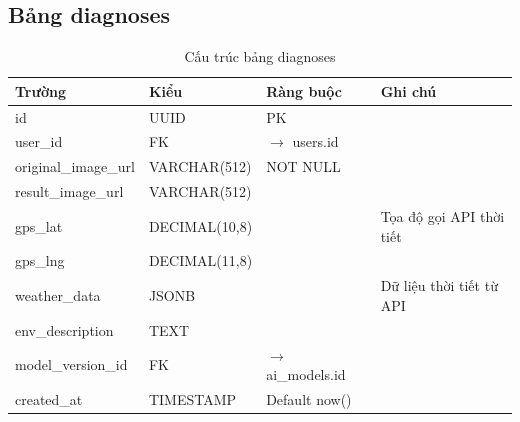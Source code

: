 \documentclass[12pt,a4paper]{article}
\begin{document}
\subsection{Bảng diagnoses}
\begin{longtable}{|l|l|l|p{5.5cm}|}
    \caption{Cấu trúc bảng diagnoses}                                                             \\
    \hline
    \rowcolor{headerblue}
    \textbf{Trường}      & \textbf{Kiểu} & \textbf{Ràng buộc}          & \textbf{Ghi chú}         \\
    \hline
    id                   & UUID          & PK                          &                          \\
    \hline
    user\_id             & FK            & $\rightarrow$ users.id      &                          \\
    \hline
    original\_image\_url & VARCHAR(512)  & NOT NULL                    &                          \\
    \hline
    result\_image\_url   & VARCHAR(512)  &                             &                          \\
    \hline
    gps\_lat             & DECIMAL(10,8) &                             & Tọa độ gọi API thời tiết \\
    \hline
    gps\_lng             & DECIMAL(11,8) &                             &                          \\
    \hline
    weather\_data        & JSONB         &                             & Dữ liệu thời tiết từ API \\
    \hline
    env\_description     & TEXT          &                             &                          \\
    \hline
    model\_version\_id   & FK            & $\rightarrow$ ai\_models.id &                          \\
    \hline
    created\_at          & TIMESTAMP     & Default now()               &                          \\
    \hline
\end{longtable}
\end{document}
